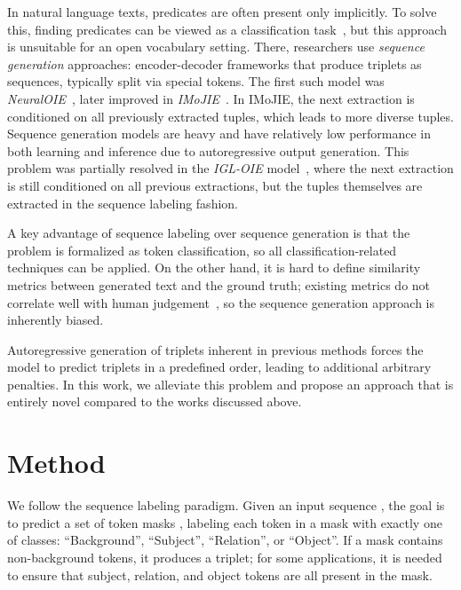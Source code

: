\documentclass[letterpaper]{article} \usepackage{aaai22}  \usepackage{times}  \usepackage{helvet}  \usepackage{courier}  \usepackage[hyphens]{url}  \usepackage{graphicx} \usepackage{placeins}
\begin{document}
In natural language texts, predicates are often present only implicitly. To solve this, finding predicates can be viewed as a classification task~\cite{zeng2014relation}, but this approach is unsuitable for an open vocabulary setting. There, researchers use \textit{sequence generation} approaches: encoder-decoder frameworks that produce triplets as sequences, typically split via special tokens.
The first such model was \emph{NeuralOIE}~\cite{cui-etal-2018-neural}, later improved in \emph{IMoJIE}~\cite{kolluru2020imojie}. In IMoJIE, the next extraction is conditioned on all previously extracted tuples, which leads to more diverse tuples. Sequence generation models are heavy and have relatively low performance in both learning and inference due to autoregressive output generation. This problem was partially resolved in the \emph{IGL-OIE} model~\cite{kolluru2020openie6}, where the next extraction is still conditioned on all previous extractions, but the tuples themselves are extracted in the sequence labeling fashion.

A key advantage of sequence labeling over sequence generation is that the problem is formalized as token classification, so all classification-related techniques can be applied.
On the other hand, it is hard to define similarity metrics between generated text and the ground truth; existing metrics do not correlate well with human judgement~\cite{mathur2020tangled,lukasik2020semantic}, so the sequence generation approach is inherently biased.

Autoregressive generation of triplets inherent in previous methods forces the model to predict triplets in a predefined order, leading to additional arbitrary penalties.
In this work, we alleviate this problem and propose an approach that is entirely novel compared to the works discussed above.



\section{Method}\label{sec:method}
\def\ntok{n_{\mathrm{tokens}}}
\def\ntrip{n_{\mathrm{triplets}}}
\def\mtrip{m_{\mathrm{triplets}}}
\def\nclass{n_{\mathrm{classes}}}

We follow the sequence labeling paradigm.
Given an input sequence , the goal is to predict a set  of token masks , labeling each token in a mask with exactly one of  classes: ``Background'', ``Subject'', ``Relation'', or ``Object''. If a mask contains non-background tokens, it produces a triplet; for some applications, it is needed to ensure that subject, relation, and object tokens are all present in the mask.
\end{document}
